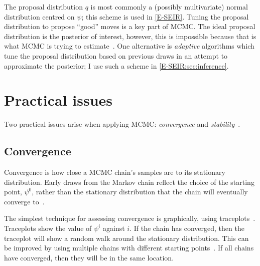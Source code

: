 \documentclass[thesis.tex]{subfiles}
\begin{document}
The proposal distribution $q$ is most commonly a (possibly multivariate) normal distribution centred on $\psi$; this scheme is used in \cref{E-SEIR}.
Tuning the proposal distribution to propose ``good'' moves is a key part of MCMC.
The ideal proposal distribution is the posterior of interest, however, this is impossible because that is what MCMC is trying to estimate~\autocite[296]{gelmanBDA}.
One alternative is \emph{adaptive} algorithms which tune the proposal distribution based on previous draws in an attempt to approximate the posterior; I use such a scheme in \cref{E-SEIR:sec:inference}.

\section{Practical issues}

Two practical issues arise when applying MCMC: \emph{convergence} and \emph{stability}~\autocite[72]{lunnBUGS}.

\subsection{Convergence} \label{MCMC:sec:convergence}

Convergence is how close a MCMC chain's samples are to its stationary distribution.
Early draws from the Markov chain reflect the choice of the starting point, $\psi^0$, rather than the stationary distribution that the chain will eventually converge to~\autocite[282]{gelmanBDA}.

The simplest technique for assessing convergence is graphically, using traceplots~\autocite[81]{brooksMCMCNotes}.
Traceplots show the value of $\psi^i$ against $i$.
If the chain has converged, then the traceplot will show a random walk around the stationary distribution.
This can be improved by using multiple chains with different starting points~\autocite[283]{gelmanBDA}.
If all chains have converged, then they will be in the same location.
\end{document}
